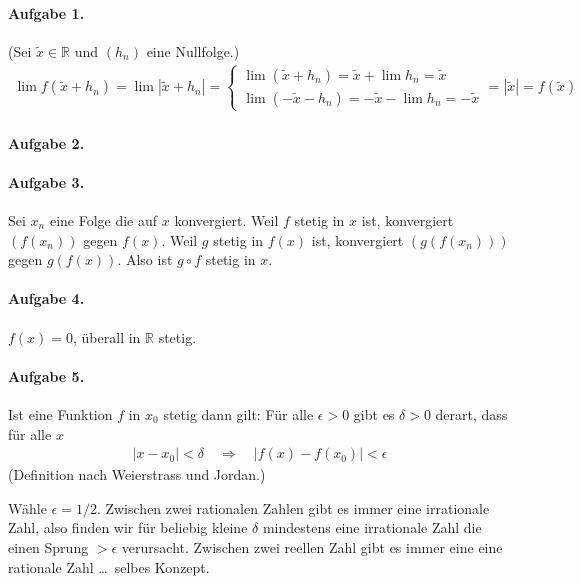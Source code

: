 \documentclass{article}
\begin{document}
\paragraph{Aufgabe 1.} (Sei $\tilde{x} \in \mathbb{R}$ und $(h_n)$ eine Nullfolge.)
\begin{align*}
    \lim f(\tilde{x} + h_n) = \lim |\tilde{x} + h_n| = \begin{cases}
        \lim (\tilde{x} + h_n) = \tilde{x} + \lim h_n = \tilde{x} \\
        \lim (-\tilde{x} - h_n) = -\tilde{x} - \lim h_n = -\tilde{x}
    \end{cases} = |\tilde{x}| = f(\tilde{x})
\end{align*}

\paragraph{Aufgabe 2.}

\paragraph{Aufgabe 3.} Sei $x_n$ eine Folge die auf $x$ konvergiert. Weil $f$ stetig in $x$ ist, konvergiert $(f(x_n))$ gegen $f(x)$. Weil $g$ stetig in $f(x)$ ist, konvergiert $(g(f(x_n)))$ gegen $g(f(x))$. Also ist $g \circ f$ stetig in $x$.

\paragraph{Aufgabe 4.} $f(x) = 0$, überall in $\mathbb{R}$ stetig.

\paragraph{Aufgabe 5.}

Ist eine Funktion $f$ in $x_0$ stetig dann gilt: Für alle $\epsilon > 0$ gibt es $\delta > 0$ derart, dass für alle $x$
\begin{align*}
    |x - x_0| < \delta \quad\Longrightarrow\quad |f(x) - f(x_0)| < \epsilon
\end{align*}
(Definition nach Weierstrass und Jordan.)

Wähle $\epsilon = 1/2$. Zwischen zwei rationalen Zahlen gibt es immer eine irrationale Zahl, also finden wir für beliebig kleine $\delta$ mindestens eine irrationale Zahl die einen Sprung $>\epsilon$ verursacht. Zwischen zwei reellen Zahl gibt es immer eine eine rationale Zahl \ldots\ selbes Konzept.
\end{document}
